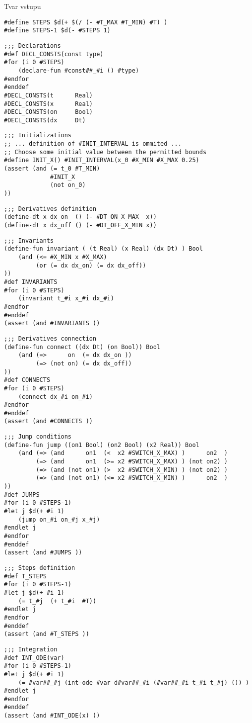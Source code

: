 \documentclass[thesis=M,czech]{FITthesis}[2012/06/26]
\begin{document}
\begin{section}{Tvar vstupu}
\begin{Verbatim}[samepage=true]
#define STEPS $d(+ $(/ (- #T_MAX #T_MIN) #T) )
#define STEPS-1 $d(- #STEPS 1)
\end{Verbatim}
\begin{Verbatim}[samepage=true]
;;; Declarations
#def DECL_CONSTS(const type)
#for (i 0 #STEPS)
    (declare-fun #const##_#i () #type)
#endfor
#enddef
#DECL_CONSTS(t      Real)
#DECL_CONSTS(x      Real)
#DECL_CONSTS(on     Bool)
#DECL_CONSTS(dx     Dt)
\end{Verbatim}
\begin{Verbatim}[samepage=true]
;;; Initializations
;; ... definition of #INIT_INTERVAL is ommited ...
;; Choose some initial value between the permitted bounds
#define INIT_X() #INIT_INTERVAL(x_0 #X_MIN #X_MAX 0.25)
(assert (and (= t_0 #T_MIN)
             #INIT_X
             (not on_0)
))
\end{Verbatim}
\begin{Verbatim}[samepage=true]
;;; Derivatives definition
(define-dt x dx_on  () (- #DT_ON_X_MAX  x))
(define-dt x dx_off () (- #DT_OFF_X_MIN x))
\end{Verbatim}
\begin{Verbatim}[samepage=true]
;;; Invariants
(define-fun invariant ( (t Real) (x Real) (dx Dt) ) Bool
    (and (<= #X_MIN x #X_MAX)
         (or (= dx dx_on) (= dx dx_off))
))
#def INVARIANTS
#for (i 0 #STEPS)
    (invariant t_#i x_#i dx_#i)
#endfor
#enddef
(assert (and #INVARIANTS ))
\end{Verbatim}
\begin{Verbatim}[samepage=true]
;;; Derivatives connection
(define-fun connect ((dx Dt) (on Bool)) Bool
    (and (=>      on  (= dx dx_on ))
         (=> (not on) (= dx dx_off))
))
#def CONNECTS
#for (i 0 #STEPS)
    (connect dx_#i on_#i)
#endfor
#enddef
(assert (and #CONNECTS ))
\end{Verbatim}
\begin{Verbatim}[samepage=true]
;;; Jump conditions
(define-fun jump ((on1 Bool) (on2 Bool) (x2 Real)) Bool
    (and (=> (and      on1  (<  x2 #SWITCH_X_MAX) )      on2  )
         (=> (and      on1  (>= x2 #SWITCH_X_MAX) ) (not on2) )
         (=> (and (not on1) (>  x2 #SWITCH_X_MIN) ) (not on2) )
         (=> (and (not on1) (<= x2 #SWITCH_X_MIN) )      on2  )
))
#def JUMPS
#for (i 0 #STEPS-1)
#let j $d(+ #i 1)
    (jump on_#i on_#j x_#j)
#endlet j
#endfor
#enddef
(assert (and #JUMPS ))
\end{Verbatim}
\begin{Verbatim}[samepage=true]
;;; Steps definition
#def T_STEPS
#for (i 0 #STEPS-1)
#let j $d(+ #i 1)
    (= t_#j  (+ t_#i  #T))
#endlet j
#endfor
#enddef
(assert (and #T_STEPS ))
\end{Verbatim}
\begin{Verbatim}[samepage=true]
;;; Integration
#def INT_ODE(var)
#for (i 0 #STEPS-1)
#let j $d(+ #i 1)
    (= #var##_#j (int-ode #var d#var##_#i (#var##_#i t_#i t_#j) ()) )
#endlet j
#endfor
#enddef
(assert (and #INT_ODE(x) ))
\end{Verbatim}


\end{section}
\end{document}
